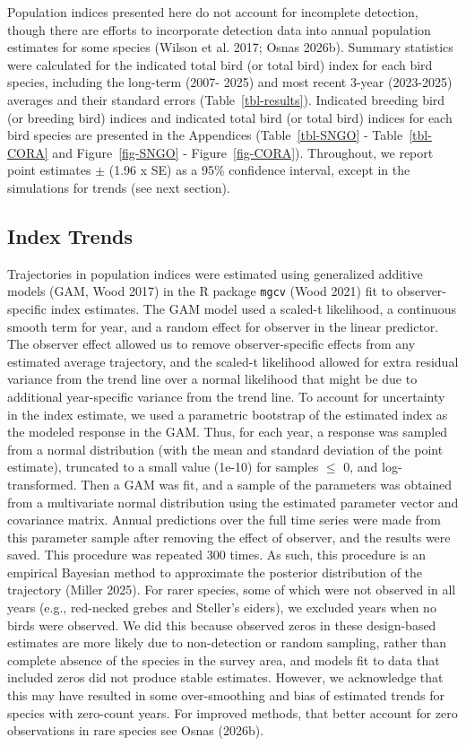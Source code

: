 \documentclass[
]{article}
\begin{document}
Population indices presented here do not account for incomplete
detection, though there are efforts to incorporate detection data into
annual population estimates for some species (Wilson et al. 2017; Osnas
2026b). Summary statistics were calculated for the indicated total bird
(or total bird) index for each bird species, including the long-term
(2007- 2025) and most recent 3-year (2023-2025) averages and their
standard errors (Table~\ref{tbl-results}). Indicated breeding bird (or
breeding bird) indices and indicated total bird (or total bird) indices
for each bird species are presented in the Appendices
(Table~\ref{tbl-SNGO} - Table~\ref{tbl-CORA} and Figure~\ref{fig-SNGO} -
Figure~\ref{fig-CORA}). Throughout, we report point estimates \(\pm\)
(1.96 x SE) as a 95\% confidence interval, except in the simulations for
trends (see next section).

\subsection*{Index Trends}\label{index-trends}

Trajectories in population indices were estimated using generalized
additive models (GAM, Wood 2017) in the R package \texttt{mgcv} (Wood
2021) fit to observer-specific index estimates. The GAM model used a
scaled-t likelihood, a continuous smooth term for year, and a random
effect for observer in the linear predictor. The observer effect allowed
us to remove observer-specific effects from any estimated average
trajectory, and the scaled-t likelihood allowed for extra residual
variance from the trend line over a normal likelihood that might be due
to additional year-specific variance from the trend line. To account for
uncertainty in the index estimate, we used a parametric bootstrap of the
estimated index as the modeled response in the GAM. Thus, for each year,
a response was sampled from a normal distribution (with the mean and
standard deviation of the point estimate), truncated to a small value
(1e-10) for samples \(\leq\) 0, and log-transformed. Then a GAM was fit,
and a sample of the parameters was obtained from a multivariate normal
distribution using the estimated parameter vector and covariance matrix.
Annual predictions over the full time series were made from this
parameter sample after removing the effect of observer, and the results
were saved. This procedure was repeated 300 times. As such, this
procedure is an empirical Bayesian method to approximate the posterior
distribution of the trajectory (Miller 2025). For rarer species, some of
which were not observed in all years (e.g., red-necked grebes and
Steller's eiders), we excluded years when no birds were observed. We did
this because observed zeros in these design-based estimates are more
likely due to non-detection or random sampling, rather than complete
absence of the species in the survey area, and models fit to data that
included zeros did not produce stable estimates. However, we acknowledge
that this may have resulted in some over-smoothing and bias of estimated
trends for species with zero-count years. For improved methods, that
better account for zero observations in rare species see Osnas (2026b).
\end{document}
